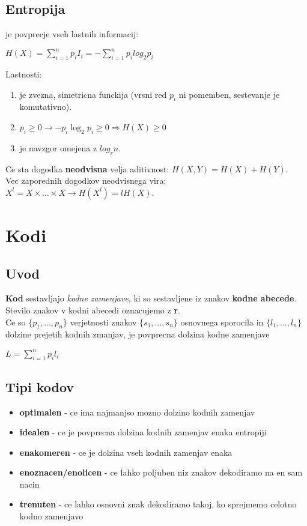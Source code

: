 \documentclass{article}
\begin{document}
\begin{multicols}{2}
	\subsection{Entropija}
	je povprecje vseh lastnih informacij:
	\begin{center}
		\begin{math}
			H(X) = \sum_{i=1}^{n} p_i I_i = -\sum_{i=1}^{n} p_i log_2 p_i
		\end{math}
	\end{center}
	Lastnosti:
	\begin{enumerate}
		\item je zvezna, simetricna funckija (vrsni red $p_i$ ni pomemben, sestevanje je komutativno).
		\item $p_i \geq 0 \rightarrow -p_i \log_2 p_i \geq 0 \Rightarrow H(X) \geq 0$
		\item je navzgor omejena z $log_r n$.
	\end{enumerate}

	Ce sta dogodka \textbf{neodvisna} velja aditivnost: $H(X, Y) = H(X) + H(Y)$.\\
	Vec zaporednih dogodkov neodvisnega vira: $X^l = X \times \dots \times X \rightarrow H(X^l) = lH(X)$.

	\section{Kodi}

	\subsection{Uvod}
	\textbf{Kod} sestavljajo \textit{kodne zamenjave}, ki so sestavljene iz znakov
	\textbf{kodne abecede}. Stevilo znakov v kodni abecedi oznacujemo z \textbf{r}.\\
	Ce so $\{p_1, \dots, p_n\}$ verjetnosti znakov $\{s_1, \dots, s_n\}$ osnovnega sporocila in $\{l_1, \dots, l_n\}$
	dolzine prejetih kodnih zmanjav, je povprecna dolzina kodne zamenjave
	\begin{center}
		\begin{math}
			L = \sum_{i=1}^n p_i l_i
		\end{math}
	\end{center}

	\subsection{Tipi kodov} %
	\begin{itemize}
		\item \textbf{optimalen} - ce ima najmanjso mozno dolzino kodnih zamenjav
		\item \textbf{idealen} - ce je povprecna dolzina kodnih zamenjav enaka entropiji
		\item \textbf{enakomeren} - ce je dolzina vseh kodnih zamenjav enaka
		\item \textbf{enoznacen/enolicen} - ce lahko poljuben niz znakov dekodiramo na en sam nacin
		\item \textbf{trenuten} - ce lahko osnovni znak dekodiramo takoj, ko sprejmemo celotno kodno zamenjavo
	\end{itemize}


\end{multicols}
\end{document}
